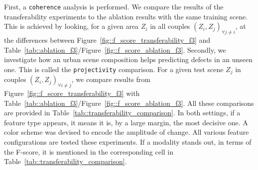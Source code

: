         First, a \texttt{coherence} analysis is performed.
        We compare the results of the transferability experiments to the ablation results with the same training scene.
        This is achieved by looking, for a given area $Z_i$ in all couples $(Z_i, Z_j)_{\forall j \neq i}$, at the differences between Figure~\ref{fig::f_score_transferability_f3} and Table~\ref{tab::ablation_f3}/Figure~\ref{fig::f_score_ablation_f3}.
        Secondly, we investigate how an urban scene composition helps predicting defects in an unseen one.
        This is called the \texttt{projectivity} comparison.
        For a given test scene $Z_j$ in couples $(Z_i, Z_j)_{\forall i \neq j}$, we compare results from Figure~\ref{fig::f_score_transferability_f3} with Table~\ref{tab::ablation_f3}/Figure~\ref{fig::f_score_ablation_f3}.
        All these comparisons are provided in Table~\ref{tab::transferability_comparison}.
        In both settings, if a feature type appears, it means it is, by a large margin, the most decisive one.
        A color scheme was devised to encode the amplitude of change.
        All various feature configurations are tested these experiments.
        If a modality stands out, in terms of the F-score, it is mentioned in the corresponding cell in Table~\ref{tab::transferability_comparison}.\\


